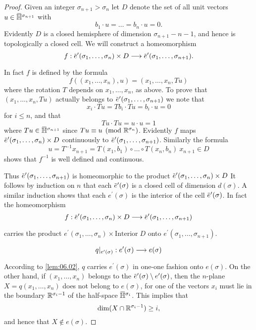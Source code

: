 \documentclass[../main]{subfiles}
\begin{document}
\begin{proof}
Given an integer $\sigma_{n+1}>\sigma_{n}$ let $D$ denote the set of all unit vectors $u \in \xoverline{\halfspace}^{\sigma_{n+1}}$ with
\[
b_{1} \cdot u=\dots=b_{n} \cdot u=0.
\]
Evidently $D$ is a closed hemisphere of dimension $\sigma_{n+1}-n-1$, and hence is topologically a closed cell. We will construct a homeomorphism
\[f:{\xoverline{e}^{\prime}(\sigma_{1},\dots, \sigma_{n}) \times D} \varrightarrow{} {\xoverline{e}^{\prime}(\sigma_{1},\dots, \sigma_{n+1})}.
\]
In fact $f$ is defined by the formula
\[
f((x_{1},\dots, x_{n}), u)=(x_{1},\dots, x_{n}, Tu)
\]
where the rotation $T$ depends on $x_{1},\dots, x_{n}$, as above. To prove that $(x_{1},\dots, x_{n}, Tu)$ actually belongs to $\xoverline{e}^{\prime}(\sigma_{1},\dots, \sigma_{n+1})$ we note that
\[
x_{i} \cdot Tu=Tb_{i} \cdot Tu=b_{i} \cdot u=0
\]
for $i \leq n$, and that
\[
Tu \cdot Tu=u \cdot u=1
\]
where $Tu \in \xoverline{\halfspace}^{\sigma_{n+1}}$ since $Tu \equiv u\pmod{\mathbb R^{\sigma_{n}}}$. Evidently $f$ maps $\xoverline{e}^{\prime}(\sigma_{1},\dots, \sigma_{n}) \times D$ continuously to $\xoverline{e}^{\prime}(\sigma_{1},\dots, \sigma_{n+1}) $. Similarly the formula
\[
u=T^{-1} x_{n+1}=T(x_{1}, b_{1}) \circ\dots \circ T(x_{n}, b_{n})\: x_{n+1} \in D
\]
shows that $f^{-1}$ is well defined and continuous.

Thus $\xoverline{e}^{\prime}(\sigma_{1},\dots, \sigma_{n+1})$ is homeomorphic to the product $\xoverline{e}^{\prime}(\sigma_{1},\dots, \sigma_{n}) \times D$ It follows by induction on $n$ that each $\xoverline{e}^{\prime}(\sigma)$ is a closed cell of dimension $d(\sigma) $. A similar induction shows that each $e^{\prime}(\sigma)$ is the interior of the cell $\xoverline{e}^{\prime}(\sigma) $. In fact the homeomorphism
\[
f:{\xoverline{e}^{\prime}(\sigma_{1},\dots, \sigma_{n}) \times D} \varrightarrow{} {\xoverline{e}^{\prime}(\sigma_{1},\dots, \sigma_{n+1})}
\]
carries the product $e^{\prime}(\sigma_{1},\dots, \sigma_{n}) \times \mathrm{Interior}\; D$ onto $e^{\prime}(\sigma_{1},\dots, \sigma_{n+1})$.

\noindent{}
\[
q|_{e^{\prime}(\sigma)} : {e^{\prime}(\sigma)} \varrightarrow{} {e(\sigma)}
\]
 According to \ref{lem:06.02}, $q$ carries $e^{\prime}(\sigma)$ in one-one fashion onto $e(\sigma) $. On the other hand, if $(x_{1},\dots, x_{n})$ belongs to the  $\xoverline{e}^{\prime}(\sigma)\setminus e^{\prime}(\sigma)$, then the $n$-plane $X=q(x_{1},\dots, x_{n})$ does not belong to $e(\sigma)$, for one of the vectors $x_{i}$ must lie in the boundary $\mathbb R^{\sigma_{i}-1}$ of the half-space $\xoverline{\halfspace}^{\sigma_{i}}$. This implies that
\[
\dim(X \cap \mathbb R^{\sigma_{i}-1}) \geq i,
\]
and hence that $X \notin e(\sigma)$.


\end{proof}
\end{document}
